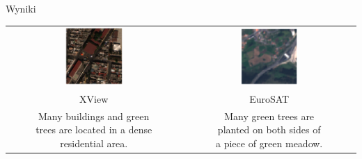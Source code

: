 \documentclass{beamer}
\begin{document}
\begin{frame}{Wyniki}
  \begin{table}[h]
    \centering
    \small
    \begin{tabular}{cc}
      \includegraphics[width=0.35\textwidth]{../img/xview_2.png} & \includegraphics[width=0.35\textwidth]{../img/eurosat_2.png}  \\
      XView &  EuroSAT \\ [1em]
      \makecell{Many buildings and green \\trees are located in a dense\\ residential area.} & \makecell{Many green trees are\\ planted on both sides of\\ a piece of green meadow.}
    \end{tabular}
  \end{table}
\end{frame}
\end{document}
